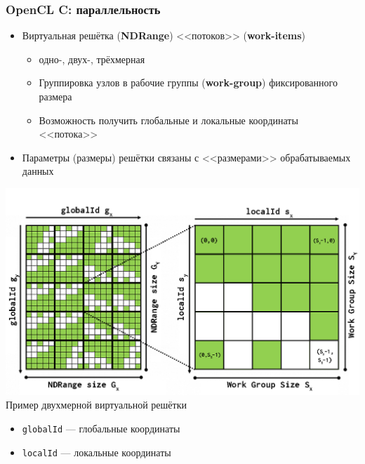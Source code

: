 \documentclass[xcolor=table,aspectratio=169]{beamer}
\begin{document}
\begin{frame}[fragile]
  \frametitle{OpenCL C: параллельность}
  \begin{minipage}[t]{0.5\textwidth}
  \begin{itemize}
    \item Виртуальная решётка (\textbf{NDRange}) <<потоков>> (\textbf{work-items})
    \begin{itemize}
      \item одно-, двух-, трёхмерная
      \item Группировка узлов в рабочие группы (\textbf{work-group}) фиксированного размера
      \item Возможность получить глобальные и локальные координаты <<потока>>
    \end{itemize}
    \item Параметры (размеры) решётки связаны с <<размерами>> обрабатываемых данных
  \end{itemize}
\end{minipage}
\begin{minipage}[t]{0.48\textwidth}
  \begin{center}
    \vspace{-1cm}
  \includegraphics[valign=t,width=\textwidth]{pictures/opeclmap4.png}
  Пример двухмерной виртуальной решётки\footnotemark
  \end{center}
  \begin{itemize}
    \item \texttt{globalId} --- глобальные координаты
    \item \texttt{localId} --- локальные координаты
  \end{itemize}
\end{minipage}
\end{frame}
\end{document}
